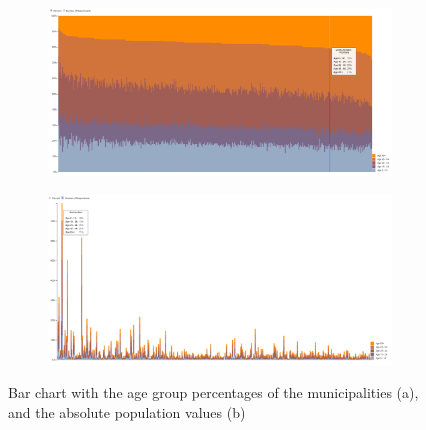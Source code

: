 \begin{figure}[h!]
    \centering
    \captionsetup{justification=centering,margin=0.5cm}
    \begin{subfigure}[t]{0.48\textwidth}
        \includegraphics[width=\textwidth]{img/normalizedbarchart.png}
        \caption{ }
    \end{subfigure}
    \begin{subfigure}[t]{0.48\textwidth}
        \includegraphics[width=\textwidth]{img/normalbarchart.png}
        \caption{ }
    \end{subfigure}
    \caption{Bar chart with the age group percentages of the municipalities (a), and the absolute population values (b)}
    \label{fig:bar}
\end{figure}

